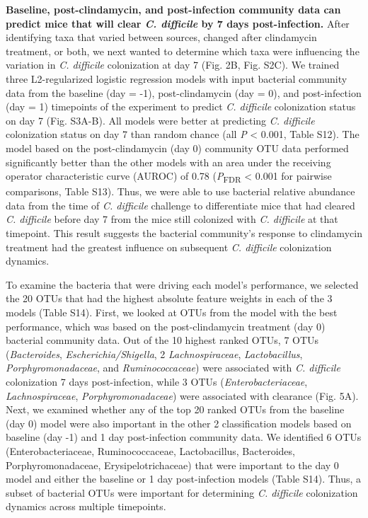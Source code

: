 \documentclass[
  11pt,
]{article}
\begin{document}
\textbf{Baseline, post-clindamycin, and post-infection community data
can predict mice that will clear \emph{C. difficile} by 7 days
post-infection.} After identifying taxa that varied between sources,
changed after clindamycin treatment, or both, we next wanted to
determine which taxa were influencing the variation in \emph{C.
difficile} colonization at day 7 (Fig. 2B, Fig. S2C). We trained three
L2-regularized logistic regression models with input bacterial community
data from the baseline (day = -1), post-clindamycin (day = 0), and
post-infection (day = 1) timepoints of the experiment to predict
\emph{C. difficile} colonization status on day 7 (Fig. S3A-B). All
models were better at predicting \emph{C. difficile} colonization status
on day 7 than random chance (all \emph{P} \textless{} 0.001, Table S12).
The model based on the post-clindamycin (day 0) community OTU data
performed significantly better than the other models with an area under
the receiving operator characteristic curve (AUROC) of 0.78
(\emph{P}\textsubscript{FDR} \textless{} 0.001 for pairwise comparisons,
Table S13). Thus, we were able to use bacterial relative abundance data
from the time of \emph{C. difficile} challenge to differentiate mice
that had cleared \emph{C. difficile} before day 7 from the mice still
colonized with \emph{C. difficile} at that timepoint. This result
suggests the bacterial community's response to clindamycin treatment had
the greatest influence on subsequent \emph{C. difficile} colonization
dynamics.

To examine the bacteria that were driving each model's performance, we
selected the 20 OTUs that had the highest absolute feature weights in
each of the 3 models (Table S14). First, we looked at OTUs from the
model with the best performance, which was based on the post-clindamycin
treatment (day 0) bacterial community data. Out of the 10 highest ranked
OTUs, 7 OTUs (\emph{Bacteroides}, \emph{Escherichia/Shigella}, 2
\emph{Lachnospiraceae}, \emph{Lactobacillus}, \emph{Porphyromonadaceae},
and \emph{Ruminococcaceae}) were associated with \emph{C. difficile}
colonization 7 days post-infection, while 3 OTUs
(\emph{Enterobacteriaceae}, \emph{Lachnospiraceae},
\emph{Porphyromonadaceae}) were associated with clearance (Fig. 5A).
Next, we examined whether any of the top 20 ranked OTUs from the
baseline (day 0) model were also important in the other 2 classification
models based on baseline (day -1) and 1 day post-infection community
data. We identified 6 OTUs (Enterobacteriaceae, Ruminococcaceae,
Lactobacillus, Bacteroides, Porphyromonadaceae, Erysipelotrichaceae)
that were important to the day 0 model and either the baseline or 1 day
post-infection models (Table S14). Thus, a subset of bacterial OTUs were
important for determining \emph{C. difficile} colonization dynamics
across multiple timepoints.
\end{document}
